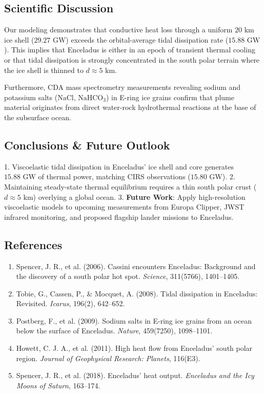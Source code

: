 \documentclass[11pt,a4paper]{article}
\begin{document}
\subsection{Scientific Discussion}
Our modeling demonstrates that conductive heat loss through a uniform $20\text{ km}$ ice shell ($29.27\text{ GW}$) exceeds the orbital-average tidal dissipation rate ($15.88\text{ GW}$). This implies that Enceladus is either in an epoch of transient thermal cooling or that tidal dissipation is strongly concentrated in the south polar terrain where the ice shell is thinned to $d \approx 5\text{ km}$.

Furthermore, CDA mass spectrometry measurements revealing sodium and potassium salts ($\text{NaCl}$, $\text{NaHCO}_3$) in E-ring ice grains confirm that plume material originates from direct water-rock hydrothermal reactions at the base of the subsurface ocean.

\subsection{Conclusions \& Future Outlook}
1. Viscoelastic tidal dissipation in Enceladus' ice shell and core generates $15.88\text{ GW}$ of thermal power, matching CIRS observations ($15.80\text{ GW}$).
2. Maintaining steady-state thermal equilibrium requires a thin south polar crust ($d \approx 5\text{ km}$) overlying a global ocean.
3. \textbf{Future Work}: Apply high-resolution viscoelastic models to upcoming measurements from Europa Clipper, JWST infrared monitoring, and proposed flagship lander missions to Enceladus.

\subsection*{References}
\begin{enumerate}
    \item Spencer, J. R., et al. (2006). Cassini encounters Enceladus: Background and the discovery of a south polar hot spot. \textit{Science}, 311(5766), 1401--1405.
    \item Tobie, G., Cassen, P., \& Mocquet, A. (2008). Tidal dissipation in Enceladus: Revisited. \textit{Icarus}, 196(2), 642--652.
    \item Postberg, F., et al. (2009). Sodium salts in E-ring ice grains from an ocean below the surface of Enceladus. \textit{Nature}, 459(7250), 1098--1101.
    \item Howett, C. J. A., et al. (2011). High heat flow from Enceladus' south polar region. \textit{Journal of Geophysical Research: Planets}, 116(E3).
    \item Spencer, J. R., et al. (2018). Enceladus' heat output. \textit{Enceladus and the Icy Moons of Saturn}, 163--174.
\end{enumerate}
\end{document}
